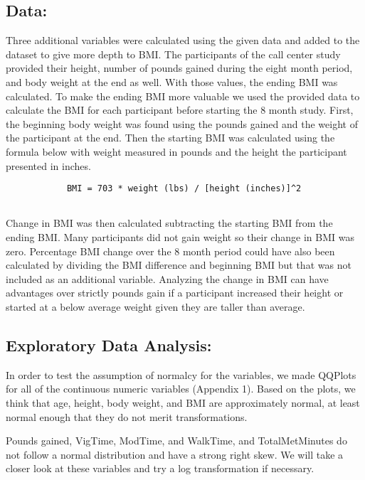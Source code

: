\documentclass[]{article}
\begin{document}
\hypertarget{data}{%
\subsection{Data:}\label{data}}

Three additional variables were calculated using the given data and
added to the dataset to give more depth to BMI. The participants of the
call center study provided their height, number of pounds gained during
the eight month period, and body weight at the end as well. With those
values, the ending BMI was calculated. To make the ending BMI more
valuable we used the provided data to calculate the BMI for each
participant before starting the 8 month study. First, the beginning body
weight was found using the pounds gained and the weight of the
participant at the end. Then the starting BMI was calculated using the
formula below with weight measured in pounds and the height the
participant presented in inches.

\begin{verbatim}
            BMI = 703 * weight (lbs) / [height (inches)]^2
            
\end{verbatim}

Change in BMI was then calculated subtracting the starting BMI from the
ending BMI. Many participants did not gain weight so their change in BMI
was zero. Percentage BMI change over the 8 month period could have also
been calculated by dividing the BMI difference and beginning BMI but
that was not included as an additional variable. Analyzing the change in
BMI can have advantages over strictly pounds gain if a participant
increased their height or started at a below average weight given they
are taller than average.

\hypertarget{exploratory-data-analysis}{%
\subsection{Exploratory Data
Analysis:}\label{exploratory-data-analysis}}

In order to test the assumption of normalcy for the variables, we made
QQPlots for all of the continuous numeric variables (Appendix 1). Based
on the plots, we think that age, height, body weight, and BMI are
approximately normal, at least normal enough that they do not merit
transformations.

Pounds gained, VigTime, ModTime, and WalkTime, and TotalMetMinutes do
not follow a normal distribution and have a strong right skew. We will
take a closer look at these variables and try a log transformation if
necessary.
\end{document}
